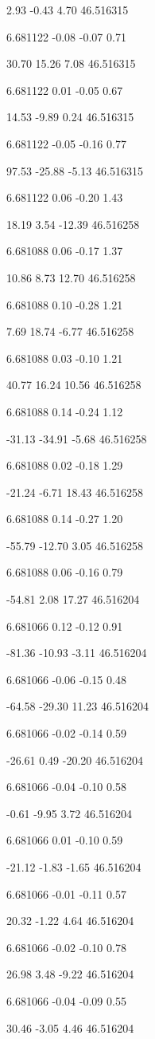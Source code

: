 2.93
-0.43
4.70
46.516315

6.681122
-0.08
-0.07
0.71

30.70
15.26
7.08
46.516315

6.681122
0.01
-0.05
0.67

14.53
-9.89
0.24
46.516315

6.681122
-0.05
-0.16
0.77

97.53
-25.88
-5.13
46.516315

6.681122
0.06
-0.20
1.43

18.19
3.54
-12.39
46.516258

6.681088
0.06
-0.17
1.37

10.86
8.73
12.70
46.516258

6.681088
0.10
-0.28
1.21

7.69
18.74
-6.77
46.516258

6.681088
0.03
-0.10
1.21

40.77
16.24
10.56
46.516258

6.681088
0.14
-0.24
1.12

-31.13
-34.91
-5.68
46.516258

6.681088
0.02
-0.18
1.29

-21.24
-6.71
18.43
46.516258

6.681088
0.14
-0.27
1.20

-55.79
-12.70
3.05
46.516258

6.681088
0.06
-0.16
0.79

-54.81
2.08
17.27
46.516204

6.681066
0.12
-0.12
0.91

-81.36
-10.93
-3.11
46.516204

6.681066
-0.06
-0.15
0.48

-64.58
-29.30
11.23
46.516204

6.681066
-0.02
-0.14
0.59

-26.61
0.49
-20.20
46.516204

6.681066
-0.04
-0.10
0.58

-0.61
-9.95
3.72
46.516204

6.681066
0.01
-0.10
0.59

-21.12
-1.83
-1.65
46.516204

6.681066
-0.01
-0.11
0.57

20.32
-1.22
4.64
46.516204

6.681066
-0.02
-0.10
0.78

26.98
3.48
-9.22
46.516204

6.681066
-0.04
-0.09
0.55

30.46
-3.05
4.46
46.516204

